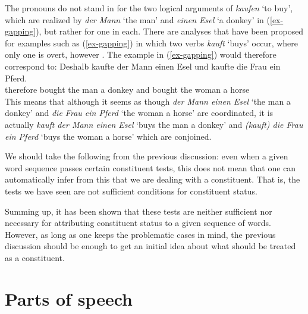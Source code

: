 \eal
{}
\zl
The pronouns do not stand in for the two logical arguments of \emph{kaufen} `to buy', which are realized by
\emph{der Mann} `the man' and \emph{einen Esel} `a donkey' in (\ref{ex-gapping}), but rather for one in each. There are analyses
that have been proposed for examples such as (\ref{ex-gapping}) in which two verbs \emph{kauft} `buys' occur, 
where only one is overt, however \citep{Crysmann2003c}. The example in (\ref{ex-gapping}) would therefore correspond to:
\ea
\gll Deshalb kaufte der Mann einen Esel und kaufte die Frau ein Pferd.\\
	 therefore bought the man a donkey and bought the woman a horse\\
\z
This means that although it seems as though \emph{der Mann einen Esel} `the man a donkey' and
\emph{die Frau ein Pferd} `the woman a horse' are coordinated, it is actually
\emph{kauft der Mann einen Esel} `buys the man a donkey' and \emph{(kauft) die Frau ein Pferd} `buys
the woman a horse' which are conjoined.

We should take the following from the previous discussion: even when a given word sequence passes certain constituent tests,
this does not mean that one can automatically infer from this that we are dealing with a
constituent. That is, the tests we have seen are not sufficient conditions for constituent status.

\largerpage[2]
Summing up, it has been shown that these tests are neither sufficient nor necessary for attributing
constituent status to a given sequence of words. However, as long as one keeps the problematic cases
in mind, the previous discussion should be enough to get an initial idea about what should be treated as a
constituent.

\section{Parts of speech}
\label{Abschnitt-Wortarten}

